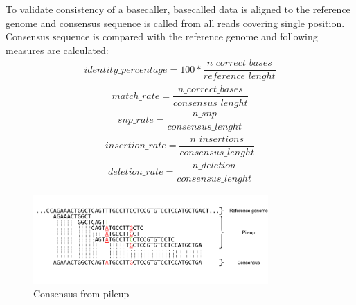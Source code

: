 \documentclass[times, utf8, diplomski, numeric, english]{fer}
\begin{document}
To validate consistency of a basecaller, basecalled data is aligned to the reference genome and consensus sequence is called from all reads covering single position. Consensus sequence is compared with the reference genome and following measures are calculated:
\begin{equation}
\begin{gathered}
identity\_percentage =  100 * \dfrac{n\_correct\_bases}{reference\_lenght}
\end{gathered}
\end{equation}
\begin{equation}
\begin{gathered}
match\_rate = \dfrac{n\_correct\_bases}{consensus\_lenght}
\end{gathered}
\end{equation}
\begin{equation}
\begin{gathered}
snp\_rate = \dfrac{n\_snp}{consensus\_lenght}
\end{gathered}
\end{equation}
\begin{equation}
\begin{gathered}
insertion\_rate = \dfrac{n\_insertions}{consensus\_lenght}
\end{gathered}
\end{equation}
\begin{equation}
\begin{gathered}
deletion\_rate = \dfrac{n\_deletion}{consensus\_lenght}
\end{gathered}
\end{equation}



\begin{figure}[!ht]
	\begin{center}
		\includegraphics[width=0.8\textwidth]{./imgs/consnesus.png}
		\caption{Consensus from pileup}
		\label{fg:consensus}
	\end{center}
\end{figure}
\end{document}
